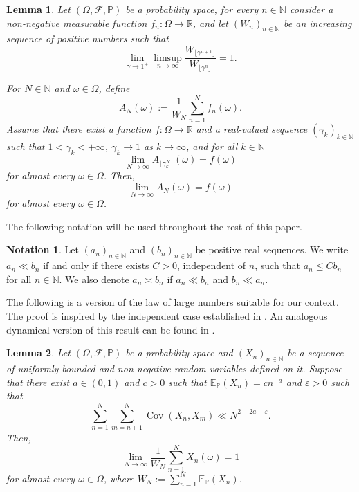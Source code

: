\documentclass[11pt]{amsart}
\numberwithin{equation}{section}
\newtheorem{lemma}{Lemma}[section]
\theoremstyle{definition}
\newtheorem*{notation}{Notation}
\theoremstyle{plain}
\newcommand{\N}{{\mathbb N}}
\newcommand{\Cov}{\operatorname{Cov}}
\begin{document}
\begin{lemma} Let $(\Omega,\mathcal{F},\mathbb{P})$ be a probability space, for every $n\in \N$ consider a non-negative measurable function  $f_n\colon\Omega\to \mathbb{R}$, and let $(W_n)_{n\in \mathbb{N}}$ be an increasing sequence of positive numbers such that
\begin{equation}
    \lim_{\gamma\to 1^{+}}\limsup_{n\to \infty} \dfrac{W_{\lfloor\gamma^{n+1}\rfloor}}{W_{\lfloor\gamma^{n}\rfloor}}=1.\label{lemma1_h}
\end{equation}

For $N\in \N$ and $\omega\in \Omega$, define
\[A_N(\omega):=\dfrac{1}{W_N}\sum_{n=1}^{N} f_n(\omega).\]
Assume that there exist a function $f\colon \Omega\to \mathbb{R}$ and a real-valued sequence $(\gamma_k)_{k\in \mathbb{N}}$ such that $1<\gamma_k<+\infty$, $\gamma_k\to 1$ as $k\to \infty$, and for all $k\in \mathbb{N}$   
\[\lim_{N\to \infty}A_{\lfloor\gamma_k^{N}\rfloor}(\omega)=f(\omega)\]
for almost every $\omega\in\Omega$.
Then,
\[\lim_{N\to \infty} A_N(\omega)=f(\omega) \]
for almost every $\omega\in\Omega$.\label{lemma1}
\end{lemma}


The following notation will be used throughout the rest of this paper.
\begin{notation}
    Let $(a_n)_{n\in \N}$ and $(b_n)_{n\in \N}$ be positive real sequences. We write $a_n\ll b_n$ if and only if there exists $C>0$, independent of $n$, such that $a_n\leq Cb_n$ for all $n\in \N$. We also denote $a_n\asymp b_n$ if  $a_n\ll b_n$ and $b_n\ll a_n$.
\end{notation} 

The following is a version of the law of large numbers suitable for our context. The proof is inspired by the independent case established in \cite[Lemma A.6]{Frantzikinakis_Lesigne_Wierdl}. An analogous dynamical version of this result can be found in \cite[Theorem 2.3]{Viktoria_Xing2021}.


\begin{lemma}
Let $(\Omega,\mathcal{F},\mathbb{P})$ be a probability space and $(X_n)_{n\in \N}$ be a sequence of uniformly bounded and non-negative random variables defined on it. Suppose that there exist $a\in (0,1)$ and $c>0$ such that $\mathbb{E}_{\mathbb{P}}(X_n)=cn^{-a}$ and $\varepsilon>0$ such that
    \begin{equation*}
    \sum_{n=1}^N\sum_{m=n+1}^N\Cov(X_n,X_m)\ll N^{2-2a-\varepsilon}.
    \end{equation*}
    Then,
    \[\lim_{N\to \infty}\dfrac{1}{W_N}\sum_{n=1}^NX_n(\omega)=1\]
    for almost every $\omega\in \Omega$, where $W_N:=\sum_{n=1}^N \mathbb{E}_{\mathbb{P}}(X_n)$.\label{LLN}
\end{lemma}
\end{document}
